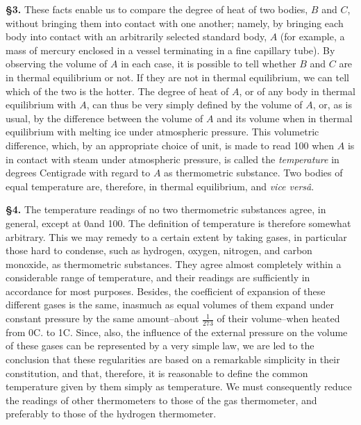 \documentclass[oneside,12pt]{book}
\begin{document}
\textbf{\S 3.} These facts enable us to compare the degree of heat of two bodies, $B$ and $C$, without bringing them into contact with one another; namely, by bringing each body into contact with an arbitrarily selected standard body, $A$ (for example, a mass of mercury enclosed in a vessel terminating in a fine capillary tube). By observing the volume of $A$ in each case, it is possible to tell whether $B$ and $C$ are in thermal equilibrium or not. If they are not in thermal equilibrium, we can tell which of the two is the hotter. The degree of heat of $A$, or of any body in thermal equilibrium with $A$, can thus be very simply defined by the volume of $A$, or, as is usual, by the difference between the volume of $A$ and its volume when in thermal equilibrium with melting ice under atmospheric pressure. This volumetric difference, which, by an appropriate choice of unit, is made to read 100 when $A$ is in contact with steam under atmospheric pressure, is called the \textit{temperature} in degrees Centigrade with regard to $A$ as thermometric substance. Two bodies of equal temperature are, therefore, in thermal equilibrium, and \textit{vice vers\^a}. \par 

\textbf{\S 4.} The temperature readings of no two thermometric substances agree, in general, except at 0\textdegree and 100\textdegree. The definition of temperature is therefore somewhat arbitrary. This we may remedy to a certain extent by taking gases, in particular those hard to condense, such as hydrogen, oxygen, nitrogen, and carbon monoxide, as thermometric substances. They agree almost completely within a considerable range of temperature, and their readings are sufficiently in accordance for most purposes. Besides, the coefficient of expansion of these different gases is the same, inasmuch as equal volumes of them expand under constant pressure by the same amount--about $\frac{1}{273}$ of their volume--when heated from 0\textdegree C. to 1\textdegree C. Since, also, the influence of the external pressure on the volume of these gases can be represented by a very simple law, we are led to the conclusion that these regularities are based on a remarkable simplicity in their constitution, and that, therefore, it is reasonable to define the common temperature given by them simply as temperature. We must consequently reduce the readings of other thermometers to those of the gas thermometer, and preferably to those of the hydrogen thermometer. \par 
\end{document}
